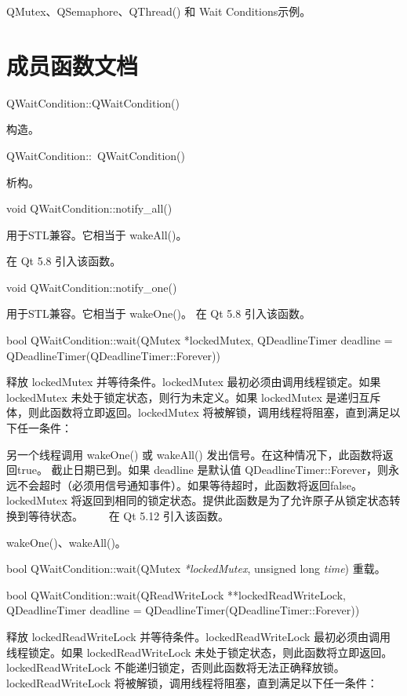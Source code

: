 \begin{notice}[另请参阅]
QMutex、QSemaphore、QThread() 和 Wait Conditions示例。
\end{notice}


\section{成员函数文档}

QWaitCondition::QWaitCondition()

构造。

QWaitCondition::~QWaitCondition()

析构。

void QWaitCondition::notify\_all()

用于STL兼容。它相当于 wakeAll()。

在 Qt 5.8 引入该函数。

void QWaitCondition::notify\_one()

用于STL兼容。它相当于 wakeOne()。
在 Qt 5.8 引入该函数。

bool QWaitCondition::wait(QMutex *lockedMutex, QDeadlineTimer deadline = QDeadlineTimer(QDeadlineTimer::Forever))

释放 lockedMutex 并等待条件。lockedMutex 最初必须由调用线程锁定。如果 lockedMutex 未处于锁定状态，则行为未定义。如果 lockedMutex 是递归互斥体，则此函数将立即返回。lockedMutex 将被解锁，调用线程将阻塞，直到满足以下任一条件：

另一个线程调用 wakeOne() 或 wakeAll() 发出信号。在这种情况下，此函数将返回true。
截止日期已到。如果 deadline 是默认值 QDeadlineTimer::Forever，则永远不会超时（必须用信号通知事件）。如果等待超时，此函数将返回false。
lockedMutex 将返回到相同的锁定状态。提供此函数是为了允许原子从锁定状态转换到等待状态。   在 Qt 5.12 引入该函数。

\begin{notice}[另请参阅]
 wakeOne()、wakeAll()。
\end{notice}

bool QWaitCondition::wait(QMutex \emph{*lockedMutex}, unsigned long \emph{time})
重载。

bool QWaitCondition::wait(QReadWriteLock **lockedReadWriteLock, QDeadlineTimer deadline = QDeadlineTimer(QDeadlineTimer::Forever))

释放 lockedReadWriteLock 并等待条件。lockedReadWriteLock 最初必须由调用线程锁定。如果 lockedReadWriteLock 未处于锁定状态，则此函数将立即返回。 lockedReadWriteLock 不能递归锁定，否则此函数将无法正确释放锁。lockedReadWriteLock 将被解锁，调用线程将阻塞，直到满足以下任一条件：

